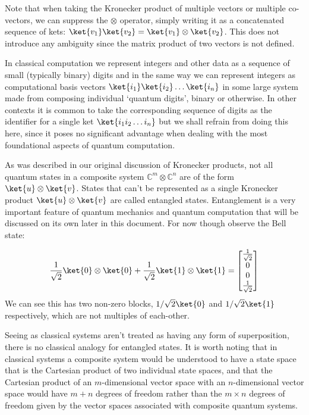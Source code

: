 Note that when taking the Kronecker product of multiple vectors or multiple co-vectors, we can suppress the $\otimes$ operator, simply writing it as a concatenated sequence of kets: $\ket{v_1}\ket{v_2} = \ket{v_1}\otimes\ket{v_2}$. This does not introduce any ambiguity since the matrix product of two vectors is not defined.

In classical computation we represent integers and other data as a sequence of small (typically binary) digits and in the same way we can represent integers as computational basis vectors $\ket{i_1}\ket{i_2}\dots\ket{i_n}$ in some large system made from composing individual `quantum digits', binary or otherwise. In other contexts it is common to take the corresponding sequence of digits as the identifier for a single ket $\ket{i_1i_2\dots i_n}$ but we shall refrain from doing this here, since it poses no significant advantage when dealing with the most foundational aspects of quantum computation.

As was described in our original discussion of Kronecker products, not all quantum states in a composite system $\mathbb{C}^m\otimes\mathbb{C}^n$ are of the form $\ket{u}\otimes\ket{v}$. States that can't be represented as a single Kronecker product $\ket{u}\otimes\ket{v}$ are called entangled states. Entanglement is a very important feature of quantum mechanics and quantum computation that will be discussed on its own later in this document. For now though observe the Bell state:

\[\frac{1}{\sqrt{2}}\ket{0}\otimes\ket{0} + \frac{1}{\sqrt{2}}\ket{1}\otimes\ket{1} = \left[\begin{matrix}
\frac{1}{\sqrt{2}}\\
0\\
0\\
\frac{1}{\sqrt{2}}
\end{matrix}\right]\]
We can see this has two non-zero blocks, $1/\sqrt{2}\ket{0}$ and $1/\sqrt{2}\ket{1}$ respectively, which are not multiples of each-other.

Seeing as classical systems aren't treated as having any form of superposition, there is no classical analogy for entangled states. It is worth noting that in classical systems a composite system would be understood to have a state space that is the Cartesian product of two individual state spaces, and that the Cartesian product of an $m$-dimensional vector space with an $n$-dimensional vector space would have $m+n$ degrees of freedom rather than the $m\times n$ degrees of freedom given by the vector spaces associated with composite quantum systems.
